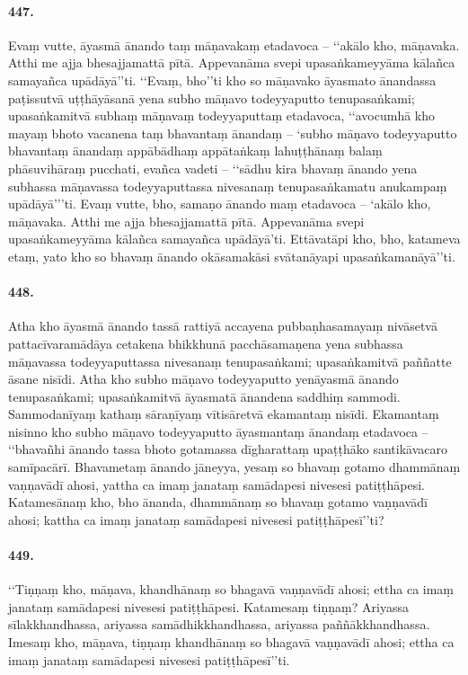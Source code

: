 \paragraph{447.} Evaṃ vutte, āyasmā ānando taṃ māṇavakaṃ etadavoca – ‘‘akālo kho, māṇavaka. Atthi me ajja bhesajjamattā pītā. Appevanāma svepi upasaṅkameyyāma kālañca samayañca upādāyā’’ti. ‘‘Evaṃ, bho’’ti kho so māṇavako āyasmato ānandassa paṭissutvā uṭṭhāyāsanā yena subho māṇavo todeyyaputto tenupasaṅkami; upasaṅkamitvā subhaṃ māṇavaṃ todeyyaputtaṃ etadavoca, ‘‘avocumhā kho mayaṃ bhoto vacanena taṃ bhavantaṃ ānandaṃ – ‘subho māṇavo todeyyaputto bhavantaṃ ānandaṃ appābādhaṃ appātaṅkaṃ lahuṭṭhānaṃ balaṃ phāsuvihāraṃ pucchati, evañca vadeti – ‘‘sādhu kira bhavaṃ ānando yena subhassa māṇavassa todeyyaputtassa nivesanaṃ tenupasaṅkamatu anukampaṃ upādāyā’’’ti. Evaṃ vutte, bho, samaṇo ānando maṃ etadavoca – ‘akālo kho, māṇavaka. Atthi me ajja bhesajjamattā pītā. Appevanāma svepi upasaṅkameyyāma kālañca samayañca upādāyā’ti. Ettāvatāpi kho, bho, katameva etaṃ, yato kho so bhavaṃ ānando okāsamakāsi svātanāyapi upasaṅkamanāyā’’ti.

\paragraph{448.} Atha kho āyasmā ānando tassā rattiyā accayena pubbaṇhasamayaṃ nivāsetvā pattacīvaramādāya cetakena bhikkhunā pacchāsamaṇena yena subhassa māṇavassa todeyyaputtassa nivesanaṃ tenupasaṅkami; upasaṅkamitvā paññatte āsane nisīdi. Atha kho subho māṇavo todeyyaputto yenāyasmā ānando tenupasaṅkami; upasaṅkamitvā āyasmatā ānandena saddhiṃ sammodi. Sammodanīyaṃ kathaṃ sāraṇīyaṃ vītisāretvā ekamantaṃ nisīdi. Ekamantaṃ nisinno kho subho māṇavo todeyyaputto āyasmantaṃ ānandaṃ etadavoca – ‘‘bhavañhi ānando tassa bhoto gotamassa dīgharattaṃ upaṭṭhāko santikāvacaro samīpacārī. Bhavametaṃ ānando jāneyya, yesaṃ so bhavaṃ gotamo dhammānaṃ vaṇṇavādī ahosi, yattha ca imaṃ janataṃ samādapesi nivesesi patiṭṭhāpesi. Katamesānaṃ kho, bho ānanda, dhammānaṃ so bhavaṃ gotamo vaṇṇavādī ahosi; kattha ca imaṃ janataṃ samādapesi nivesesi patiṭṭhāpesī’’ti?

\paragraph{449.} ‘‘Tiṇṇaṃ kho, māṇava, khandhānaṃ so bhagavā vaṇṇavādī ahosi; ettha ca imaṃ janataṃ samādapesi nivesesi patiṭṭhāpesi. Katamesaṃ tiṇṇaṃ? Ariyassa sīlakkhandhassa, ariyassa samādhikkhandhassa, ariyassa paññākkhandhassa. Imesaṃ kho, māṇava, tiṇṇaṃ khandhānaṃ so bhagavā vaṇṇavādī ahosi; ettha ca imaṃ janataṃ samādapesi nivesesi patiṭṭhāpesī’’ti.

